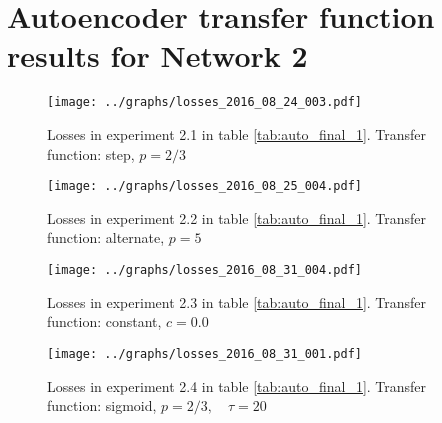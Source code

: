 %


\chapter{Autoencoder transfer function results for Network 2} \label{appendix2}


      \begin{figure}[!h]
      \centering
      \texttt{[image: ../graphs/losses\_2016\_08\_24\_003.pdf]}
      \caption{Losses in experiment 2.1 in table \ref{tab:auto_final_1}. Transfer function: step, $p=2/3$}
      \label{fig:alternate}
      \end{figure}

      \begin{figure}[!h]
      \centering
      \texttt{[image: ../graphs/losses\_2016\_08\_25\_004.pdf]}
      \caption{Losses in experiment 2.2 in table \ref{tab:auto_final_1}. Transfer function: alternate, $p=5$}
      \label{fig:alternate}
      \end{figure}

      \begin{figure}[!h]
      \centering \texttt{[image: ../graphs/losses\_2016\_08\_31\_004.pdf]}
      \caption{Losses in experiment 2.3 in table \ref{tab:auto_final_1}. Transfer function: constant, $c=0.0$}
      \label{fig:alternate} \end{figure}

      \begin{figure}[!h]
      \centering
      \texttt{[image: ../graphs/losses\_2016\_08\_31\_001.pdf]}
      \caption{Losses in experiment 2.4 in table \ref{tab:auto_final_1}. Transfer function: sigmoid, $p=2/3,\quad \tau=20$}
      \label{fig:alternate}
      \end{figure}

